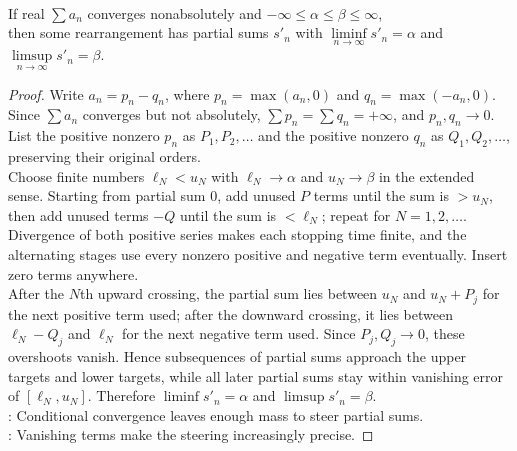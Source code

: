 \begin{theorem} \label{thm:riemann-rearrangement-theorem} \\
If real $\sum a_n$ converges nonabsolutely and $-\infty\leq\alpha\leq\beta\leq\infty$,\\
then some rearrangement has partial sums $s'_n$ with $\liminf\limits_{n\to\infty}s'_n=\alpha$ and $\limsup\limits_{n\to\infty}s'_n=\beta$.
\begin{proof}
Write $a_n=p_n-q_n$, where $p_n=\max(a_n,0)$ and $q_n=\max(-a_n,0)$. Since $\sum a_n$ converges but not absolutely, $\sum p_n=\sum q_n=+\infty$, and $p_n,q_n\to0$. List the positive nonzero $p_n$ as $P_1,P_2,\ldots$ and the positive nonzero $q_n$ as $Q_1,Q_2,\ldots$, preserving their original orders.\\
Choose finite numbers $\ell_N<u_N$ with $\ell_N\to\alpha$ and $u_N\to\beta$ in the extended sense. Starting from partial sum $0$, add unused $P$ terms until the sum is $>u_N$, then add unused terms $-Q$ until the sum is $<\ell_N$; repeat for $N=1,2,\ldots$. Divergence of both positive series makes each stopping time finite, and the alternating stages use every nonzero positive and negative term eventually. Insert zero terms anywhere.\\
After the $N$th upward crossing, the partial sum lies between $u_N$ and $u_N+P_j$ for the next positive term used; after the downward crossing, it lies between $\ell_N-Q_j$ and $\ell_N$ for the next negative term used. Since $P_j,Q_j\to0$, these overshoots vanish. Hence subsequences of partial sums approach the upper targets and lower targets, while all later partial sums stay within vanishing error of $[\ell_N,u_N]$. Therefore $\liminf s'_n=\alpha$ and $\limsup s'_n=\beta$.\\
: Conditional convergence leaves enough mass to steer partial sums.\\
: Vanishing terms make the steering increasingly precise.
\end{proof}
\end{theorem}

